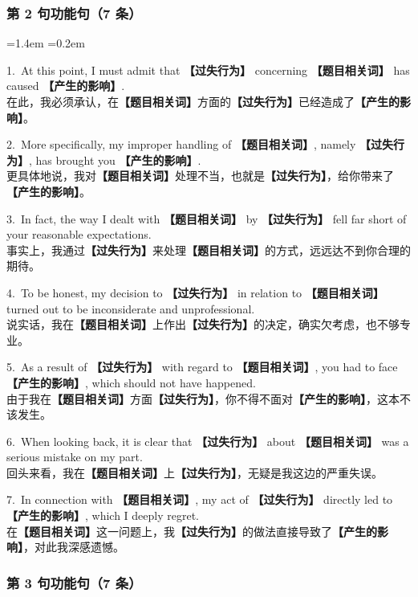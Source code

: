 \documentclass[11pt,a4paper]{ctexart}
\newcommand{\fillin}[1]{{\bfseries【#1】}}
\newenvironment{eg}{%
  \par\addvspace{4pt}%
  \begin{list}{}{\leftmargin=1.4em \rightmargin=0.2em \listparindent=0pt
    \itemindent=0pt \topsep=0pt \parsep=2pt \itemsep=2pt \partopsep=0pt}%
  \item\relax
}{%
  \end{list}\addvspace{5pt}%
}
\begin{document}
\subsubsection{第 2 句功能句（7 条）}

\begin{eg}
1.\ At this point, I must admit that \fillin{过失行为} concerning \fillin{题目相关词} has caused \fillin{产生的影响}.\\
在此，我必须承认，在\fillin{题目相关词}方面的\fillin{过失行为}已经造成了\fillin{产生的影响}。

2.\ More specifically, my improper handling of \fillin{题目相关词}, namely \fillin{过失行为}, has brought you \fillin{产生的影响}.\\
更具体地说，我对\fillin{题目相关词}处理不当，也就是\fillin{过失行为}，给你带来了\fillin{产生的影响}。

3.\ In fact, the way I dealt with \fillin{题目相关词} by \fillin{过失行为} fell far short of your reasonable expectations.\\
事实上，我通过\fillin{过失行为}来处理\fillin{题目相关词}的方式，远远达不到你合理的期待。

4.\ To be honest, my decision to \fillin{过失行为} in relation to \fillin{题目相关词} turned out to be inconsiderate and unprofessional.\\
说实话，我在\fillin{题目相关词}上作出\fillin{过失行为}的决定，确实欠考虑，也不够专业。

5.\ As a result of \fillin{过失行为} with regard to \fillin{题目相关词}, you had to face \fillin{产生的影响}, which should not have happened.\\
由于我在\fillin{题目相关词}方面\fillin{过失行为}，你不得不面对\fillin{产生的影响}，这本不该发生。

6.\ When looking back, it is clear that \fillin{过失行为} about \fillin{题目相关词} was a serious mistake on my part.\\
回头来看，我在\fillin{题目相关词}上\fillin{过失行为}，无疑是我这边的严重失误。

7.\ In connection with \fillin{题目相关词}, my act of \fillin{过失行为} directly led to \fillin{产生的影响}, which I deeply regret.\\
在\fillin{题目相关词}这一问题上，我\fillin{过失行为}的做法直接导致了\fillin{产生的影响}，对此我深感遗憾。
\end{eg}

\subsubsection{第 3 句功能句（7 条）}
\end{document}
